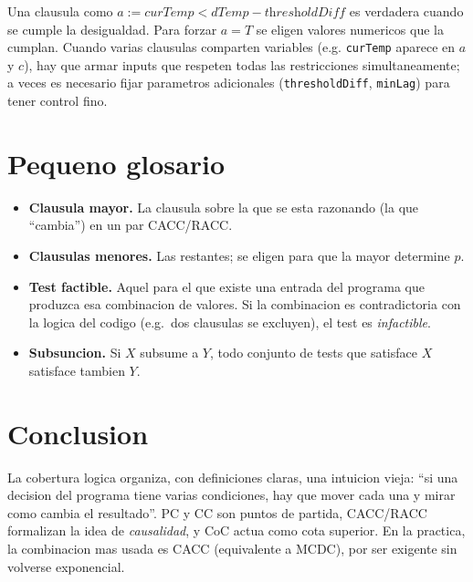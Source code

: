 \documentclass[12pt,a4paper]{article}
\begin{document}
Una clausula como $a := \textit{curTemp} < \textit{dTemp} - \textit{thresholdDiff}$ es
verdadera cuando se cumple la desigualdad. Para forzar $a = T$ se eligen valores numericos que
la cumplan. Cuando varias clausulas comparten variables (e.g. \texttt{curTemp} aparece en $a$ y
$c$), hay que armar inputs que respeten todas las restricciones simultaneamente; a veces es
necesario fijar parametros adicionales (\texttt{thresholdDiff}, \texttt{minLag}) para tener
control fino.

\section{Pequeno glosario}

\begin{itemize}
  \item \textbf{Clausula mayor.} La clausula sobre la que se esta razonando (la que ``cambia'')
  en un par CACC/RACC.
  \item \textbf{Clausulas menores.} Las restantes; se eligen para que la mayor determine $p$.
  \item \textbf{Test factible.} Aquel para el que existe una entrada del programa que produzca
  esa combinacion de valores. Si la combinacion es contradictoria con la logica del codigo
  (e.g.\ dos clausulas se excluyen), el test es \emph{infactible}.
  \item \textbf{Subsuncion.} Si $X$ subsume a $Y$, todo conjunto de tests que satisface $X$
  satisface tambien $Y$.
\end{itemize}

\section*{Conclusion}

La cobertura logica organiza, con definiciones claras, una intuicion vieja: ``si una decision
del programa tiene varias condiciones, hay que mover cada una y mirar como cambia el resultado''.
PC y CC son puntos de partida, CACC/RACC formalizan la idea de \emph{causalidad}, y CoC actua
como cota superior. En la practica, la combinacion mas usada es CACC (equivalente a MCDC), por
ser exigente sin volverse exponencial.
\end{document}
